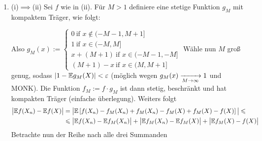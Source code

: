 \begin{enumerate}[label=\Roman*. ]
    \item (i)$\implies$(ii)\newline
    Sei $f$ wie in (ii). F\"ur $M>1$ definiere eine stetige Funktion $g_M$ mit kompaktem Tr\"ager, wie folgt: \newline \newline
    \newline
    Also $g_M(x):=
            \begin{cases}
                0 \ \text{if } x\notin(-M-1,M+1]\\
                1 \ \text{if } x\in(-M,M]\\
                x+(M+1) \ \text{if } x\in(-M-1,-M]\\
                (M+1)-x \ \text{if } x\in(M,M+1]
            \end{cases}$
    \newline\newline\newline
    W\"ahle nun $M$ gro\ss{} genug, sodass $|1-\mathbb{E} g_M(X)|<\varepsilon$ (m\"oglich wegen $g_M(x)\nto{}{M\to\infty}1$ und MONK). Die Funktion $f_M:=f\cdot g_M$ ist dann stetig, beschr\"ankt und hat kompakten Tr\"ager (einfache \"uberlegung). Weiters folgt
    \begin{align*}
        \big|\mathbb{E} f(X_n)-\mathbb{E} f(X)\big| &=\big| \mathbb{E} \left[f(X_n)-f_M(X_n)+f_M(X_n)-f_M(X)+f_M(X)-f(X)\right]\big| \leqslant \\
        &\leqslant \big|\mathbb{E} f(X_n)-\mathbb{E} f_M(X_n)\big|+\big|\mathbb{E} f_M(X_n)-\mathbb{E} f_M(X)\big|+\big|\mathbb{E} f_M(X)-f(X)\big|
    \end{align*}
    Betrachte nun der Reihe nach alle drei Summanden

\end{enumerate}
